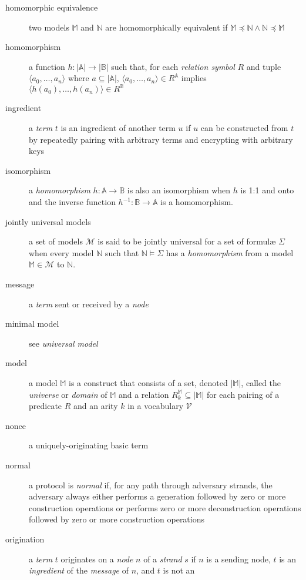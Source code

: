 \begin{description}
		\item[homomorphic equivalence]
			two models $\mathbb{M}$ and $\mathbb{N}$ are homomorphically
			equivalent if $\mathbb{M} \preceq \mathbb{N} \wedge \mathbb{N}
			\preceq \mathbb{M}$
		\item[homomorphism]
			a function $h: |\mathbb{A}|\to|\mathbb{B}|$ such that, for each
			\emph{relation symbol} $R$ and tuple $\langle a_0 , \ldots , a_n
			\rangle$ where $a \subseteq |\mathbb{A}|$, $\langle a_0 , \ldots ,
			a_n \rangle \in R^\mathbb{A}$ implies $\langle h(a_0) , \ldots ,
			h(a_n) \rangle \in R^\mathbb{B}$
		\item[ingredient]
			a \emph{term} $t$ is an ingredient of another term $u$ if $u$ can
			be constructed from $t$ by repeatedly pairing with arbitrary terms
			and encrypting with arbitrary keys
		\item[isomorphism]
			a \emph{homomorphism} $h : \mathbb{A} \to \mathbb{B}$ is also an
			isomorphism when $h$ is 1:1 and onto and the inverse
			function $h^{-1} : \mathbb{B} \to \mathbb{A}$ is a homomorphism.
		\item[jointly universal models]
			a set of models $\mathcal{M}$ is said to be jointly universal
			for a set of formul{\ae} $\Sigma$ when every model $\mathbb{N}$
			such that $\mathbb{N} \models \Sigma$ has a \emph{homomorphism} from a
			model $\mathbb{M} \in \mathcal{M}$ to $\mathbb{N}$.
		\item[message]
			a \emph{term} sent or received by a \emph{node}
		\item[minimal model]
			see \emph{universal model}
		\item[model]
			a model $\mathbb{M}$ is a construct that consists of a set, denoted
			$|\mathbb{M}|$, called the \emph{universe} or \emph{domain} of
			$\mathbb{M}$ and a relation $R^\mathbb{M}_k \subseteq |\mathbb{M}|$
			for each pairing of a predicate $R$ and an arity $k$ in a vocabulary
			$\mathcal{V}$
		\item[nonce]
			a uniquely-originating basic term
		\item[normal]
			a protocol is \emph{normal} if, for any path through adversary
			strands, the adversary always either performs a generation followed
			by zero or more construction operations or performs zero or more
			deconstruction operations followed by zero or more construction
			operations
		\item[origination]
			a \emph{term} $t$ originates on a \emph{node} $n$ of a
			\emph{strand} $s$ if $n$ is a sending node, $t$ is an
			\emph{ingredient} of the \emph{message} of $n$, and $t$ is not an

\end{description}
